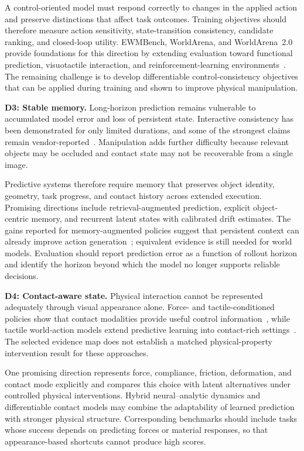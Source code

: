 \documentclass{ieeeaccess}
\begin{document}
A control-oriented model must respond correctly to changes in the applied action and preserve distinctions that affect task outcomes. Training objectives should therefore measure action sensitivity, state-transition consistency, candidate ranking, and closed-loop utility. EWMBench, WorldArena, and WorldArena~2.0 provide foundations for this direction by extending evaluation toward functional prediction, visuotactile interaction, and reinforcement-learning environments~\cite{genieenvisioner,worldarena,shang2026worldarena2}. The remaining challenge is to develop differentiable control-consistency objectives that can be applied during training and shown to improve physical manipulation.

\noindent\textbf{D3: Stable memory.}
Long-horizon prediction remains vulnerable to accumulated model error and loss of persistent state. Interactive consistency has been demonstrated for only limited durations, and some of the strongest claims remain vendor-reported~\cite{genie3}. Manipulation adds further difficulty because relevant objects may be occluded and contact state may not be recoverable from a single image.

Predictive systems therefore require memory that preserves object identity, geometry, task progress, and contact history across extended execution. Promising directions include retrieval-augmented prediction, explicit object-centric memory, and recurrent latent states with calibrated drift estimates. The gains reported for memory-augmented policies suggest that persistent context can already improve action generation~\cite{memoryvla}; equivalent evidence is still needed for world models. Evaluation should report prediction error as a function of rollout horizon and identify the horizon beyond which the model no longer supports reliable decisions.

\noindent\textbf{D4: Contact-aware state.}
Physical interaction cannot be represented adequately through visual appearance alone. Force- and tactile-conditioned policies show that contact modalities provide useful control information~\cite{forcevla,tactilevla}, while tactile world-action models extend predictive learning into contact-rich settings~\cite{dreamtac}. \textcolor[RGB]{104,48,148}{The selected evidence map does not establish a matched physical-property intervention result for these approaches.}

\textcolor[RGB]{104,48,148}{One promising direction represents force, compliance, friction, deformation, and contact mode explicitly and compares this choice with latent alternatives under controlled physical interventions.} Hybrid neural--analytic dynamics and differentiable contact models may combine the adaptability of learned prediction with stronger physical structure. Corresponding benchmarks should include tasks whose success depends on predicting forces or material responses, so that appearance-based shortcuts cannot produce high scores.
\end{document}
